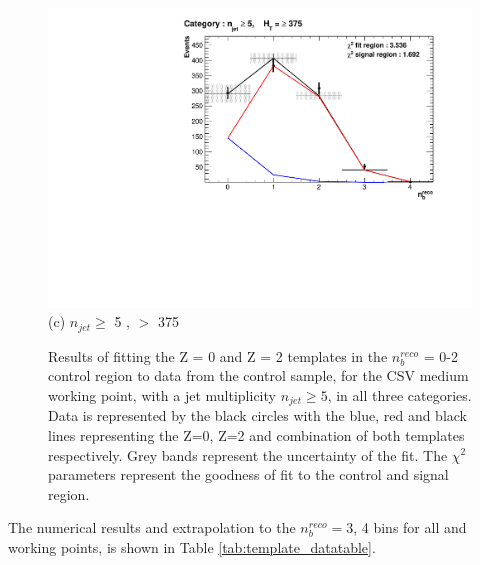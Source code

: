 \begin{figure}[ht]
\footnotesize
\centering
\begin{minipage}[b]{0.51\linewidth}
\centering
\includegraphics[width = 1.0\linewidth]{plots/ThesisPlots/Final_Fit_To_Data_Normal_Medium_HTBin_OneMuon_Template_375_jet_mult_5.pdf}
\centering (c) $n_{jet} \geq$ 5 , \theht $>$ 375 
\end{minipage}
\caption[Results of fitting the Z = 0 and Z = 2 templates in the $n_{b}^{reco}$ = 0-2 control region to data from the \mupjets control sample, for the \ac{CSV} medium working point, with a jet multiplicity $n_{jet} \geq 5$, in all three \theht categories.]{Results of fitting the Z = 0 and Z = 2 templates in the $n_{b}^{reco}$ = 0-2 control region to data from the \mupjets control sample, for the \ac{CSV} medium working point, with a jet multiplicity $n_{jet} \geq 5$, in all three \theht categories. Data is represented by the black circles with the blue, red and black lines representing the Z=0, Z=2 and combination of both templates respectively. Grey bands represent the uncertainty of the fit. The $\chi^{2}$ parameters represent the goodness of fit to the control and signal region.}
\label{fig:template_data_med_njet5}
\end{figure}
\FloatBarrier
The numerical results and extrapolation to the $n_{b}^{reco} =$3, 4 bins for all \theht and working points, is shown in Table \ref{tab:template_datatable}.

